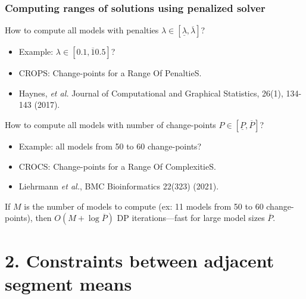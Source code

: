\documentclass{beamer}
\begin{document}
\begin{frame}
  \frametitle{Computing ranges of solutions using penalized solver}

  How to compute all models with penalties $\lambda\in[\underline \lambda, \overline \lambda]$?
  \begin{itemize}
  \item Example:  $\lambda\in[0.1, \overline 10.5]$?
  \item CROPS: Change-points for a Range Of PenaltieS.
  \item Haynes, \emph{et al.} Journal of Computational and Graphical Statistics, 26(1), 134-143 (2017).
  \end{itemize}
  
  How to compute all models with number of change-points $P\in[\underline P, \overline P]$?
  \begin{itemize}
  \item Example: all models from 50 to 60 change-points?
  \item CROCS: Change-points for a Range Of ComplexitieS.
  \item Liehrmann \emph{et al.}, BMC Bioinformatics 22(323) (2021).
  \end{itemize}

  If $M$ is the number of models to compute (ex: 11 models from 50 to
  60 change-points), then $O(M + \log \overline P)$ DP iterations---fast for large model sizes $\overline P$.
  
\end{frame}

\section{2. Constraints between adjacent segment means}
\end{document}
